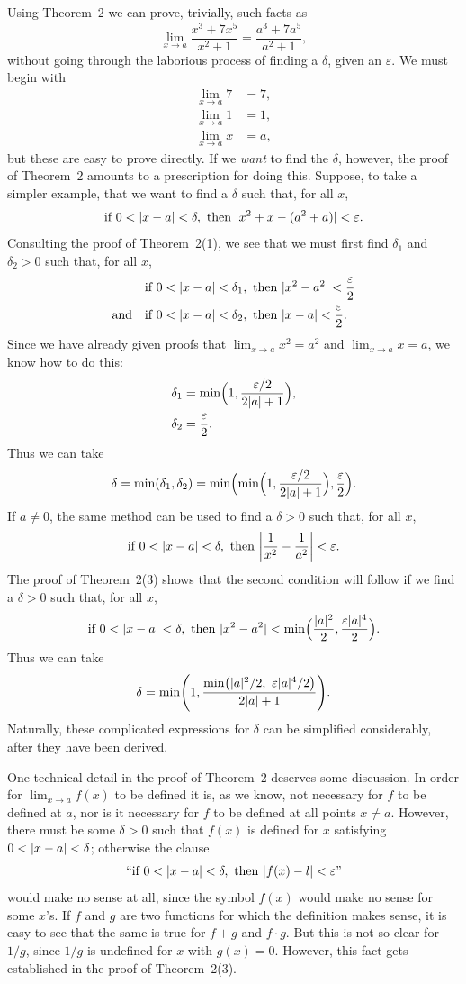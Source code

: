 Using Theorem~2 we can prove, trivially, such facts as
\[
\lim_{x\to a}\frac{x^3+7x^5}{x^2+1}=\frac{a^3+7a^5}{a^2+1},
\]
without going through the laborious process of finding a $\delta$, given an
$\varepsilon$. We must begin with
\begin{align*}
\lim_{x\to a}7&=7,\\
\lim_{x\to a}1&=1,\\
\lim_{x\to a}x&=a,
\end{align*}
but these are easy to prove directly. If we \emph{want} to find the $\delta$,
however, the proof of Theorem~2 amounts to a prescription for doing this.
Suppose, to take a simpler example, that we want to find a $\delta$ such that,
for all $x$,
\[
\text{if }0<\lvert x-a\rvert<\delta,\text{ then }\lvert x^2+x-(a^2+a)\rvert<\varepsilon.
\]
Consulting the proof of Theorem~2(1), we see that we must first find
$\delta_1$ and $\delta_2>0$ such that, for all $x$,
\begin{align*}
&\text{if }0<\lvert x-a\rvert<\delta_1,\text{ then }\lvert x^2-a^2\rvert<\frac{\varepsilon}{2}\\
\text{and}\quad &\text{if }0<\lvert x-a\rvert<\delta_2,\text{ then }\lvert x-a\rvert<\frac{\varepsilon}{2}.
\end{align*}
Since we have already given proofs that $\lim_{x\to a}x^2=a^2$ and
$\lim_{x\to a}x=a$, we know how to do this:
\begin{align*}
\delta_1&=\min\Bigl(1,\frac{\varepsilon/2}{2\lvert a\rvert+1}\Bigr),\\
\delta_2&=\frac{\varepsilon}{2}.
\end{align*}
Thus we can take
\[
\delta=\min(\delta_1,\delta_2)=\min\Bigl(\min\Bigl(1,\frac{\varepsilon/2}{2\lvert a\rvert+1}\Bigr),\frac{\varepsilon}{2}\Bigr).
\]
If $a\neq 0$, the same method can be used to find a $\delta>0$ such that, for
all $x$,
\[
\text{if }0<\abs{x-a}<\delta,\text{ then }
\abs*{\frac{1}{x^2}-\frac{1}{a^2}}<\varepsilon.
\]
The proof of Theorem~2(3) shows that the second condition will follow if we
find a $\delta>0$ such that, for all $x$,
\[
\text{if }0<\lvert x-a\rvert<\delta,\text{ then }
\lvert x^2-a^2\rvert<\min\Bigl(\frac{\lvert a\rvert^2}{2},\frac{\varepsilon\lvert a\rvert^4}{2}\Bigr).
\]
Thus we can take
\[
\delta=\min\Biggl(1,\frac{\min\bigl(\abs{a}^2/2,\ \varepsilon\abs{a}^4/2\bigr)}{2\abs{a}+1}\Biggr).
\]
Naturally, these complicated expressions for $\delta$ can be simplified
considerably, after they have been derived.

One technical detail in the proof of Theorem~2 deserves some discussion. In
order for $\lim_{x\to a}f(x)$ to be defined it is, as we know, not necessary
for $f$ to be defined at $a$, nor is it necessary for $f$ to be defined at all
points $x\neq a$. However, there must be some $\delta>0$ such that $f(x)$ is
defined for $x$ satisfying $0<\lvert x-a\rvert<\delta$; otherwise the clause
\[
\text{``if }0<\lvert x-a\rvert<\delta,\text{ then }\lvert f(x)-l\rvert<\varepsilon\text{''}
\]
would make no sense at all, since the symbol $f(x)$ would make no sense for
some $x$'s. If $f$ and $g$ are two functions for which the definition makes
sense, it is easy to see that the same is true for $f+g$ and $f\cdot g$. But
this is not so clear for $1/g$, since $1/g$ is undefined for $x$ with
$g(x)=0$. However, this fact gets established in the proof of Theorem~2(3).


